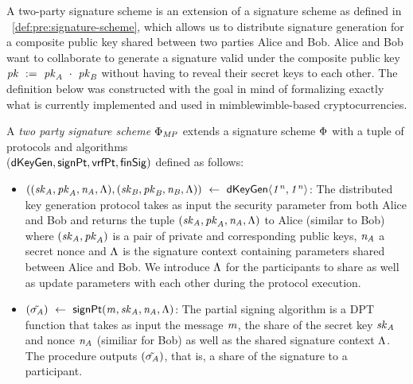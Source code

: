 A two-party signature scheme is an extension of a signature scheme as defined in ~\cref{def:pre:signature-scheme}, which allows us to distribute signature generation for a composite public key shared between two parties Alice and Bob.
Alice and Bob want to collaborate to generate a signature valid under the composite public key $\mathit{pk} ~:=~ \mathit{pk}_{\mathit{A}} ~\cdot~ \mathit{pk}_{\mathit{B}}$ without having to reveal their secret keys to each other.
The definition below was constructed with the goal in mind of formalizing exactly what is currently implemented and used in mimblewimble-based cryptocurrencies.

\begin{definition}
    \label{def:sig:two-party-sig}

    A \emph{two party signature scheme $\Phi_{\mathit{MP}}$} extends a signature scheme $\Phi$ with a tuple of protocols and algorithms\\
    ($\mathsf{dKeyGen}, \mathsf{signPt} , \mathsf{vrfPt}, \mathsf{finSig})$ defined as follows:

    \begin{itemize}
        \item $((\mathit{sk}_{\mathit{A}}, \mathit{pk}_{\mathit{A}}, \mathit{\mathit{n}_{\mathit{A}}}, \Lambda), (\mathit{sk}_{\mathit{B}}, \mathit{pk}_{\mathit{B}}, \mathit{\mathit{n}_{\mathit{B}}}, \Lambda)) ~\leftarrow~ \mathsf{dKeyGen}\langle \mathit{1^n}, \mathit{1^n} \rangle$: The distributed key generation protocol takes as input the security parameter from both Alice and Bob and returns
        the tuple $(\mathit{sk}_{\mathit{A}}, \mathit{pk}_{\mathit{A}}, \mathit{\mathit{n}_{\mathit{A}}}, \Lambda)$ to Alice (similar to Bob) where $(\mathit{sk}_{\mathit{A}}, \mathit{pk}_{\mathit{A}})$ is a pair of private and corresponding public keys, $\mathit{\mathit{n}_{\mathit{A}}}$ a secret nonce and $\Lambda$ is the signature context containing parameters shared between Alice and Bob.
        We introduce $\Lambda$ for the participants to share as well as update parameters with each other during the protocol execution.

        \item $(\tilde{\sigma_{\mathit{A}}}) ~\leftarrow~ \mathsf{signPt}(\mathit{m}, \mathit{sk}_{\mathit{A}}, \mathit{\mathit{n}_{\mathit{A}}}, \Lambda)$: The partial signing algorithm is a DPT function that takes as input the message $\mathit{m}$, the share of the secret key $\mathit{sk}_{\mathit{A}}$ and nonce $\mathit{\mathit{n}_{\mathit{A}}}$ (similiar for Bob) as well
        as the shared signature context $\Lambda$. The procedure outputs $(\tilde{\sigma_{\mathit{A}}})$, that is, a share of the signature to a participant.


\end{itemize}
\end{definition}
